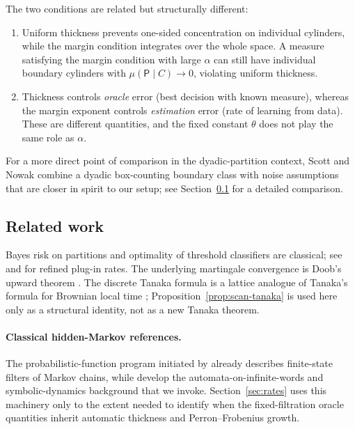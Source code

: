 The two conditions are related but structurally different:
\begin{enumerate}[label=(\arabic*)]
\item Uniform thickness prevents one-sided concentration on individual
  cylinders, while the margin condition integrates over the whole space.
  A measure satisfying the margin condition with large $\alpha$
  can still have individual boundary cylinders with $\mu(\mathsf{P}\mid C)\to 0$,
  violating uniform thickness.
\item Thickness controls \emph{oracle} error (best decision with known measure),
  whereas the margin exponent controls \emph{estimation} error (rate of
  learning from data).  These are different quantities, and the fixed
  constant $\theta$ does not play the same role as $\alpha$.
\end{enumerate}
For a more direct point of comparison in the dyadic-partition context, Scott
and Nowak \cite{ScottNowak2006} combine a dyadic box-counting boundary class
with noise assumptions that are closer in spirit to our setup; see
Section~\ref{sub:related} for a detailed comparison.

\subsection{Related work}
\label{sub:related}

Bayes risk on partitions and optimality of threshold classifiers are classical;
see \cite{DevroyeGyorfiLugosi1996} and \cite{AudibertTsybakov2007} for refined
plug-in rates.  The underlying martingale convergence is Doob's upward theorem
\cite{Doob1953,Williams1991,Durrett2019}.  The discrete Tanaka formula is a
lattice analogue of Tanaka's formula for Brownian local time
\cite{Tanaka1963,RevuzYor1999}; Proposition~\ref{prop:scan-tanaka} is used here
only as a structural identity, not as a new Tanaka theorem.

\paragraph{Classical hidden-Markov references.}
The probabilistic-function program initiated by
\cite{Blackwell1957,Heller1965,BaumPetrie1966} already describes finite-state
filters of Markov chains, while \cite{Thomas1990,PerrinPin2004,Kitchens1998}
develop the automata-on-infinite-words and symbolic-dynamics background that we
invoke.  Section~\ref{sec:rates} uses this machinery only to the extent needed
to identify when the fixed-filtration oracle quantities inherit automatic
thickness and Perron--Frobenius growth.

